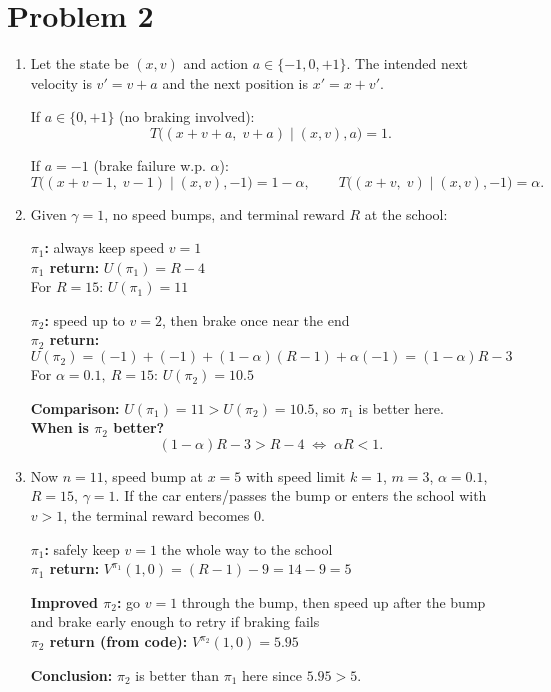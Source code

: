 \documentclass{article}
\begin{document}
\section*{Problem 2}
\begin{enumerate}[label=(\alph*)]

\item %
Let the state be $(x,v)$ and action $a\in\{-1,0,+1\}$. The intended next velocity is $v' = v+a$
and the next position is $x' = x+v'$.

\medskip
\noindent If $a\in\{0,+1\}$ (no braking involved):
\[
T\big((x+v+a,\; v+a)\mid (x,v), a\big)=1.
\]

\medskip
\noindent If $a=-1$ (brake failure w.p. $\alpha$):
\[
T\big((x+v-1,\; v-1)\mid (x,v),-1\big)=1-\alpha,
\qquad
T\big((x+v,\; v)\mid (x,v),-1\big)=\alpha.
\]

\item %
Given $\gamma=1$, no speed bumps, and terminal reward $R$ at the school:

\medskip
\noindent \textbf{$\pi_1$:} always keep speed $v=1$ \\
\textbf{$\pi_1$ return:} $U(\pi_1)=R-4$ \\
For $R=15$: $U(\pi_1)=11$

\medskip
\noindent \textbf{$\pi_2$:} speed up to $v=2$, then brake once near the end \\
\textbf{$\pi_2$ return:} 
\[
U(\pi_2)=(-1)+(-1)+(1-\alpha)(R-1)+\alpha(-1)=(1-\alpha)R-3
\]
For $\alpha=0.1,\ R=15$: $U(\pi_2)=10.5$

\medskip
\noindent \textbf{Comparison:} $U(\pi_1)=11 > U(\pi_2)=10.5$, so $\pi_1$ is better here. \\
\textbf{When is $\pi_2$ better?}
\[
(1-\alpha)R-3 > R-4 \;\Longleftrightarrow\; \alpha R < 1.
\]

\item %
Now $n=11$, speed bump at $x=5$ with speed limit $k=1$, $m=3$, $\alpha=0.1$, $R=15$, $\gamma=1$.
If the car enters/passes the bump or enters the school with $v>1$, the terminal reward becomes $0$.

\medskip
\noindent \textbf{$\pi_1$:} safely keep $v=1$ the whole way to the school \\
\textbf{$\pi_1$ return:} $V^{\pi_1}(1,0)=(R-1)-9=14-9=5$

\medskip
\noindent \textbf{Improved $\pi_2$:} go $v=1$ through the bump, then speed up after the bump and brake early enough to retry if braking fails \\
\textbf{$\pi_2$ return (from code):} $V^{\pi_2}(1,0)=5.95$

\medskip
\noindent \textbf{Conclusion:} $\pi_2$ is better than $\pi_1$ here since $5.95 > 5$.

\end{enumerate}
\end{document}
